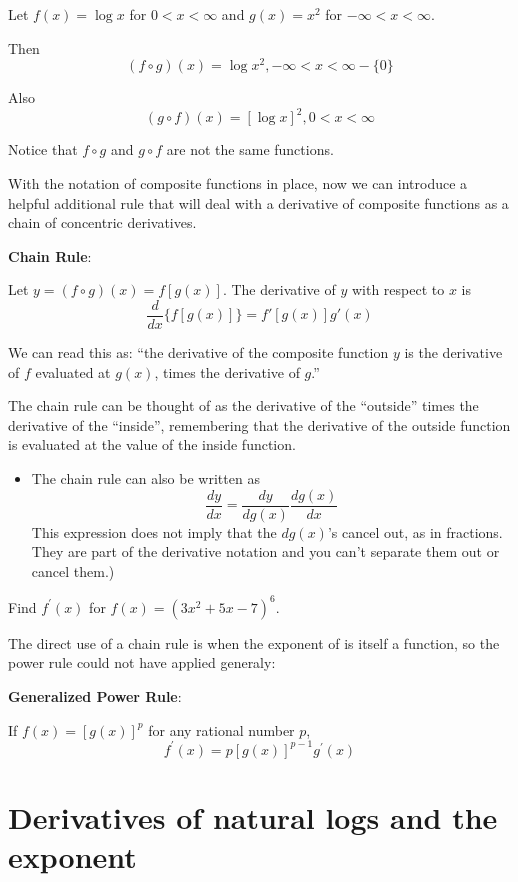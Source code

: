 \documentclass[]{book}
\providecommand{\tightlist}{%
  \setlength{\itemsep}{0pt}\setlength{\parskip}{0pt}}
\theoremstyle{definition}
\theoremstyle{definition}
\theoremstyle{definition}
\theoremstyle{remark}
\let\BeginKnitrBlock\begin \let\EndKnitrBlock\end
\begin{document}
\BeginKnitrBlock{example}
\protect\hypertarget{exm:unnamed-chunk-17}{}{\label{exm:unnamed-chunk-17} }Let \(f(x)=\log x\) for \(0<x<\infty\) and \(g(x)=x^2\) for \(-\infty<x<\infty\).

Then
\[(f\circ g)(x)=\log x^2, -\infty<x<\infty - \{0\}\]

Also
\[(g\circ f)(x)=[\log x]^2, 0<x<\infty\]

Notice that \(f\circ g\) and \(g\circ f\) are not the same functions.
\EndKnitrBlock{example}

With the notation of composite functions in place, now we can introduce a helpful additional rule that will deal with a derivative of composite functions as a chain of concentric derivatives.

\textbf{Chain Rule}:

Let \(y=(f\circ g)(x)= f[g(x)]\). The derivative of \(y\) with respect to \(x\) is \[\frac{d}{dx} \{ f[g(x)] \} = f'[g(x)] g'(x)\]

We can read this as: ``the derivative of the composite function \(y\) is the derivative of \(f\) evaluated at \(g(x)\), times the derivative of \(g\).''

The chain rule can be thought of as the derivative of the ``outside'' times the derivative of the ``inside'', remembering that the derivative of the outside function is evaluated at the value of the inside function.

\begin{itemize}
\tightlist
\item
  The chain rule can also be written as \[\frac{dy}{dx}=\frac{dy}{dg(x)} \frac{dg(x)}{dx}\] This expression does not imply that the \(dg(x)\)'s cancel out, as in fractions. They are part of the derivative notation and you can't separate them out or cancel them.)
\end{itemize}

\BeginKnitrBlock{example}[Composite Exponent]
\protect\hypertarget{exm:tothesix}{}{\label{exm:tothesix} {} }Find \(f^\prime(x)\) for \(f(x) = (3x^2+5x-7)^6\).
\EndKnitrBlock{example}

The direct use of a chain rule is when the exponent of is itself a function, so the power rule could not have applied generaly:

\textbf{Generalized Power Rule}:

If \(f(x)=[g(x)]^p\) for any rational number \(p\), \[f^\prime(x) =p[g(x)]^{p-1}g^\prime(x)\]

\hypertarget{derivatives-of-natural-logs-and-the-exponent}{%
\section{Derivatives of natural logs and the exponent}\label{derivatives-of-natural-logs-and-the-exponent}}
\end{document}
